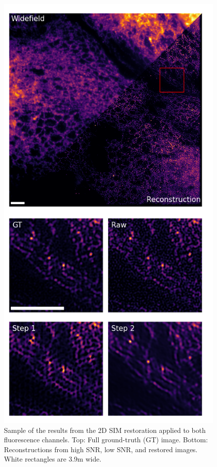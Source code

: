 \documentclass[12pt]{article}
\begin{document}
\begin{figure}[hbtp]
    \includegraphics[scale=0.78, center]{figures/er_samples.png}
    \caption{Sample of the results from the 2D SIM restoration applied to both fluorescence channels.
    Top: Full ground-truth (GT) image. Bottom: Reconstructions from high SNR, low SNR, and restored images. White rectangles are 3.9\textmu m wide.}
    \label{fig:er_samples}
\end{figure}
\end{document}

